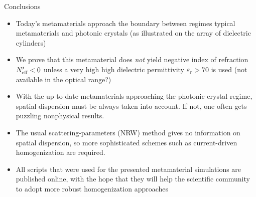 \documentclass[t]{beamer} \usepackage[english]{babel} \usepackage[utf8]{inputenc} \usetheme{Frankfurt} %
\begin{document}

\begin{frame}{Conclusions}%
\begin{itemize}
\item Today's metamaterials approach the boundary between regimes typical metamaterials and photonic crystals (as illustrated on the array of dielectric cylinders)

\item We prove that this metamaterial does \textit{not} yield negative index of refraction $N_{\text{eff} }'<0$ unless a very high high dielectric permittivity $\varepsilon_r>70$ is used (not available in the optical range?)

\item With the up-to-date metamaterials approaching the photonic-crystal regime, spatial dispersion must be always taken into account.
If not, one often gets puzzling nonphysical results.

\item The usual scattering-parameters (NRW) method gives no information on spatial dispersion, so more sophisticated schemes such as current-driven homogenization are required.

\item All scripts that were used for the presented metamaterial simulations are published online, with the hope that they will help the scientific community to adopt more robust homogenization approaches

\end{itemize}

\end{frame} %
\end{document}
